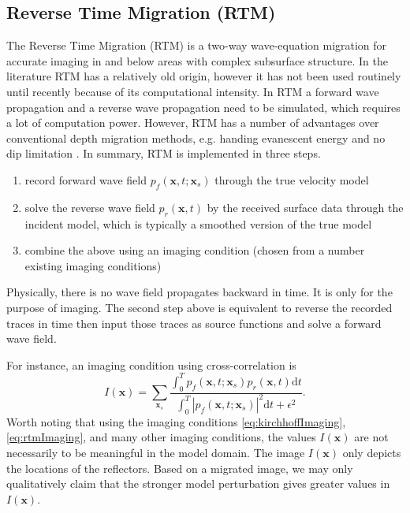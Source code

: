 \documentclass[11pt,titlepage]{article}
\newcommand{\bx}{\boldsymbol{x}}
\theoremstyle{plain}
\theoremstyle{definition}
\theoremstyle{remark}
\numberwithin{equation}{section}
\begin{document}
\subsection{Reverse Time Migration (RTM)}
The Reverse Time Migration (RTM) is a two-way wave-equation migration for accurate imaging in and below areas with complex subsurface structure. In the literature RTM has a relatively old origin, however it has not been used routinely until recently because of its computational intensity. In RTM a forward wave propagation and a reverse wave propagation need to be simulated, which requires a lot of computation power. However, RTM has a number of advantages over conventional depth migration methods, e.g. handing evanescent energy and no dip limitation \cite{McMechan:1983aa, Baysal:1983aa}. In summary, RTM is implemented in three steps. 
\begin{enumerate}
  \item record forward wave field $p_f(\bx, t; \bx_s)$ through the true velocity model
  \item solve the reverse wave field $p_r(\bx, t)$ by the received surface data through the incident model, which is typically a smoothed version of the true model
  \item combine the above using an imaging condition (chosen from a number existing imaging conditions)
\end{enumerate}
Physically, there is no wave field propagates backward in time. It is only for the purpose of imaging. The second step above is equivalent to reverse the recorded traces in time then input those traces as source functions and solve a forward wave field. 

For instance, an imaging condition using cross-correlation is 
\begin{equation}
\label{eq:rtmImaging}
I(\bx) = \sum_{\bx_s} \frac{\int_0^T p_f(\bx, t; \bx_s)p_r(\bx, t)\mathrm{d}t}{\int_0^T |p_f(\bx, t; \bx_s)|^2\mathrm{d}t + \epsilon^2}.
\end{equation}
Worth noting that using the imaging conditions \eqref{eq:kirchhoffImaging}, \eqref{eq:rtmImaging}, and many other imaging conditions, the values $I(\bx)$ are not necessarily to be meaningful in the model domain. The image $I(\bx)$ only depicts the locations of the reflectors. Based on a migrated image, we may only qualitatively claim that the stronger model perturbation gives greater values in $I(\bx)$. 
\end{document}
